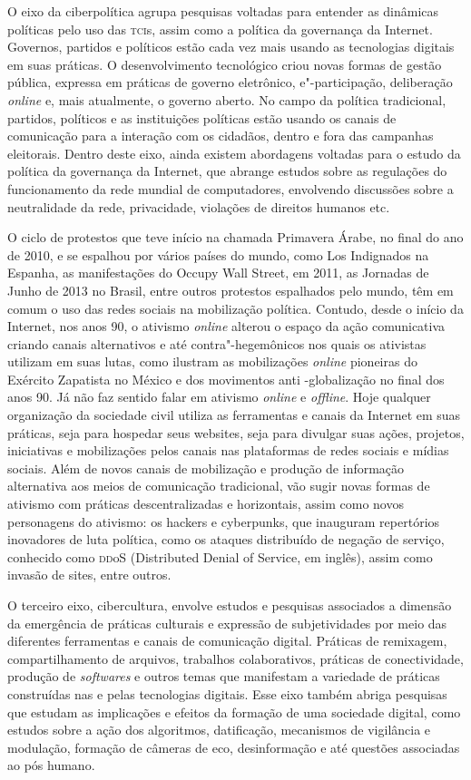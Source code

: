 O eixo da ciberpolítica agrupa pesquisas voltadas para entender as
dinâmicas políticas pelo uso das \textsc{tci}s, assim como a política da
governança da Internet. Governos, partidos e políticos estão cada vez
mais usando as tecnologias digitais em suas práticas. O desenvolvimento
tecnológico criou novas formas de gestão pública, expressa em práticas
de governo eletrônico, e"-participação, deliberação \emph{online} e, mais
atualmente, o governo aberto. No campo da política tradicional,
partidos, políticos e as instituições políticas estão usando os canais
de comunicação para a interação com os cidadãos, dentro e fora das
campanhas eleitorais. Dentro deste eixo, ainda existem abordagens
voltadas para o estudo da política da governança da Internet, que
abrange estudos sobre as regulações do funcionamento da rede mundial de
computadores, envolvendo discussões sobre a neutralidade da rede,
privacidade, violações de direitos humanos etc.

O ciclo de protestos que teve início na chamada Primavera Árabe, no
final do ano de 2010, e se espalhou por vários países do mundo, como Los
Indignados na Espanha, as manifestações do Occupy Wall Street, em 2011,
as Jornadas de Junho de 2013 no Brasil, entre outros protestos
espalhados pelo mundo, têm em comum o uso das redes sociais na
mobilização política. Contudo, desde o início da Internet, nos anos 90,
o ativismo \emph{online} alterou o espaço da ação comunicativa criando canais
alternativos e até contra"-hegemônicos nos quais os ativistas utilizam em
suas lutas, como ilustram as mobilizações \emph{online} pioneiras do Exército
Zapatista no México e dos movimentos anti -globalização no final dos
anos 90. Já não faz sentido falar em ativismo \emph{online} e \emph{offline}. Hoje
qualquer organização da sociedade civil utiliza as ferramentas e canais
da Internet em suas práticas, seja para hospedar seus websites, seja
para divulgar suas ações, projetos, iniciativas e mobilizações pelos
canais nas plataformas de redes sociais e mídias sociais. Além de novos
canais de mobilização e produção de informação alternativa aos meios de
comunicação tradicional, vão sugir novas formas de ativismo com práticas
descentralizadas e horizontais, assim como novos personagens do
ativismo: os hackers e cyberpunks, que inauguram repertórios inovadores
de luta política, como os ataques distribuído de negação de serviço,
conhecido como \textsc{dd}oS (Distributed Denial of Service, em inglês), assim
como invasão de sites, entre outros.

O terceiro eixo, cibercultura, envolve estudos e pesquisas associados a
dimensão da emergência de práticas culturais e expressão de
subjetividades por meio das diferentes ferramentas e canais de
comunicação digital. Práticas de remixagem, compartilhamento de
arquivos, trabalhos colaborativos, práticas de conectividade, produção
de \emph{softwares} e outros temas que manifestam a variedade de práticas
construídas nas e pelas tecnologias digitais. Esse eixo também abriga
pesquisas que estudam as implicações e efeitos da formação de uma
sociedade digital, como estudos sobre a ação dos algoritmos,
datificação, mecanismos de vigilância e modulação, formação de câmeras
de eco, desinformação e até questões associadas ao pós humano.


